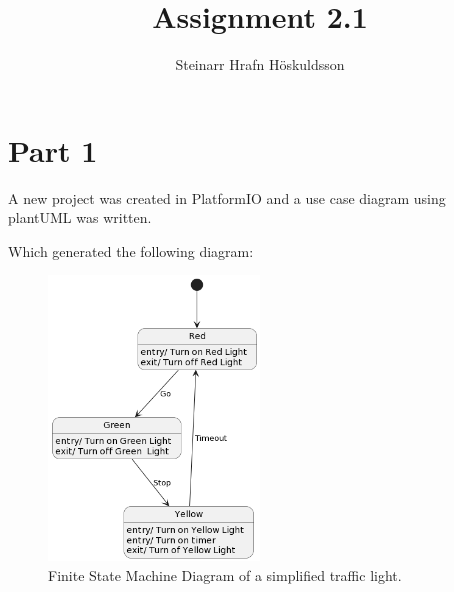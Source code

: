 \documentclass{article}
\title{Assignment 2.1}
\author{Steinarr Hrafn Höskuldsson}
\newcommand{\mycomment}[1]{}
\begin{document}
\pagestyle{firststyle}
{\let\newpage\relax\maketitle}

\mycomment{
\begin{figure}[h]
    \centering
    \texttt{[image: LAB3/Basic1.png]}
    \caption{"Switch test" Breadboard set up}
    \label{fig:Switch_test}
\end{figure}



}

\section*{Part 1}
A new project was created in PlatformIO and a use case diagram using plantUML was written. 



Which generated the following diagram:
\begin{figure}[h]
    \centering
    \includegraphics[width=0.5\textwidth]{Assignment3_1StateBehaviour/docs/diagrams/fsm2.png}
    \caption{Finite State Machine Diagram of a simplified traffic light.}
\end{figure}
\end{document}
